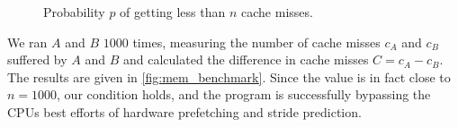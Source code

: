 
\begin{figure}

    \centering
    \caption{Probability \(p\) of getting less than \(n\) cache misses.}
    \label{fig:mem_benchmark}
\end{figure}


We ran \(A\) and \(B\) \(1000\) times, measuring the number of cache misses \(c_A\) and \(c_B\) suffered by \(A\) and \(B\) and calculated the difference in cache misses \(C = c_A - c_B\). 
The results are given in \autoref{fig:mem_benchmark}. 
Since the value is in fact close to \(n = 1000\), our condition holds, and the program is successfully bypassing the CPUs best efforts of hardware prefetching and stride prediction.

